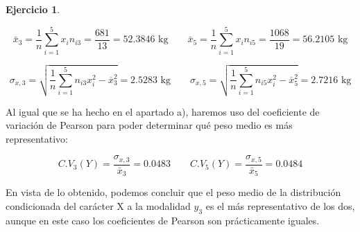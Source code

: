 \documentclass[a4paper, 12pt]{article}
\theoremstyle{definition}
\newtheorem{ej}{Ejercicio}
\begin{document}
\begin{ej}
\begin{enumerate}[label=\alph*)]
\[
	\bar{x}_{3} = \frac{1}{n} \sum_{i=1}^{5} x_i n_{i3} = \frac{681}{13} =  52.3846\text{ kg} \qquad \bar{x}_{5} = \frac{1}{n} \sum_{i=1}^{5} x_i n_{i5} = \frac{1068}{19} =  56.2105\text{ kg} 
\]

\[
	\sigma_{x,3} = \sqrt{\frac{1}{n} \sum_{i=1}^{5} n_{i3} x_i^2 - \overline{x}_{3}^{2}} = 2.5283 \text{ kg} \qquad \sigma_{x,5} = \sqrt{\frac{1}{n} \sum_{i=1}^{5} n_{i5} x_i^2 - \overline{x}_{5}^{2}} = 2.7216 \text{ kg}
\]

Al igual que se ha hecho en el apartado a), haremos uso del coeficiente de variación de Pearson para poder determinar qué peso medio es más representativo:

\[
	C.V_3(Y) = \frac{\sigma_{x,3}}{\bar{x}_{3}} = 0.0483 \qquad C.V_5(Y) = \frac{\sigma_{x,5}}{\bar{x}_{5}} = 0.0484
\]

En vista de lo obtenido, podemos concluir que el peso medio de la distribución condicionada del carácter X a la modalidad $y_3$ es el más representativo de los dos, aunque en este caso los coeficientes de Pearson son prácticamente iguales.
\end{enumerate}
\end{ej}

\bigskip
\end{document}
